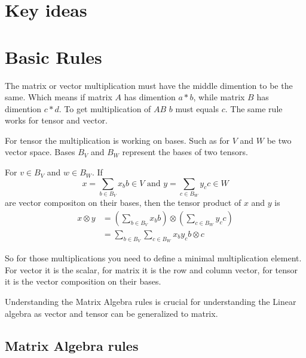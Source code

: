 \documentclass{article}
\begin{document}
\section{Key ideas}


\section{Basic Rules}

The matrix or vector multiplication must have the middle dimention to be the same. Which means if matrix $A$ has dimention $a*b$, while matrix $B$ has dimention $c*d$. To get multiplication of $AB$ $b$ must equals $c$. The same rule works for tensor and vector.

For tensor the multiplication is working on bases. Such as for $V$ and $W$ be two vector space. Bases $B_V$ and $B_W$ represent the bases of two tensors. 

For $v \in B_V$ and $w \in B_W$. If
$$ x=\sum_{b \in B_V} x_b b \in V \text{ and } y=\sum_{c\in B_W} y_c c \in W  $$
are vector compositon on their bases, then the tensor product of $x$ and $y$ is 
\begin{align}
    x \otimes y &= \left( \sum_{b \in B_V} x_b b \right) \otimes \left( \sum_{c\in B_W} y_c c \right)  \\
    &= \sum_{b \in B_V} \sum_{c\in B_W} x_b y_c b \otimes c
\end{align}

So for those multiplications you need to define a minimal multiplication element. For vector it is the scalar, for matrix it is the row and column vector, for tensor it is the vector composition on their bases.


Understanding the Matrix Algebra rules is crucial for understanding the Linear algebra as vector and tensor can be generalized to matrix. 
\subsection{Matrix Algebra rules}
\end{document}
